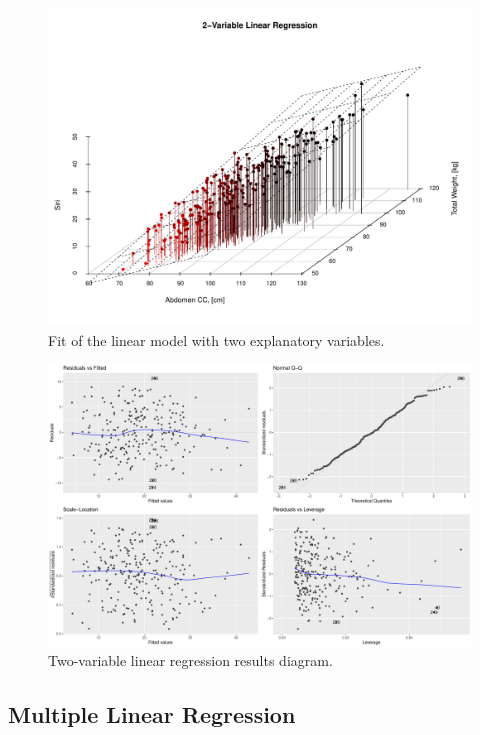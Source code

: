 \documentclass[11pt,american,american]{article}
\begin{document}
\newpage

\vspace*{\fill}
\begin{figure}[H]
	\centering
	\includegraphics[width=0.75\linewidth]{Images/FIGURES/3d_linear_regression}
	\caption{Fit of the linear model with two explanatory variables.}
	\label{fig:3d_linear_regression}
\end{figure}

\begin{figure}[H]
	\centering
	\includegraphics[width=0.95\linewidth]{Images/FIGURES/2var_linear_regression}
	\caption{Two-variable linear regression results diagram.}
	\label{fig:2var_linear_regression}
\end{figure}
\vspace*{\fill}

\newpage

\subsection{Multiple Linear Regression}
\end{document}

